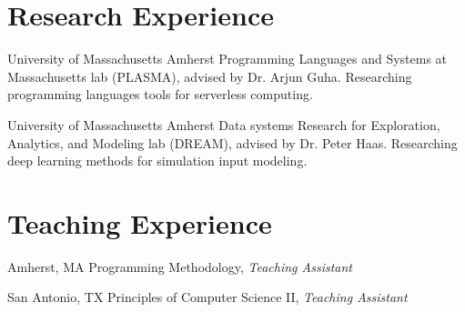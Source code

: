 \documentclass[10pt,letterpaper]{moderncv} %
\begin{document}
\section{Research Experience}

%
{University of Massachusetts Amherst}%
{}%
{}%
{Programming Languages and Systems at Massachusetts lab (PLASMA), advised by Dr.
Arjun Guha. Researching programming languages tools for serverless computing.
%
\newline{}
}

%
{University of Massachusetts Amherst}%
{}%
{}%
{Data systems Research for Exploration, Analytics, and Modeling lab (DREAM),
advised by Dr. Peter Haas. Researching deep learning methods for simulation input
modeling.
%
}


\section{Teaching Experience}

%
{Amherst, MA}%
{}%
{}%
{Programming Methodology, \textit{Teaching Assistant}
%
\newline{}
}

%
{San Antonio, TX}%
{}%
{}%
{Principles of Computer Science II, \textit{Teaching Assistant}
%
%
}

\end{document}
